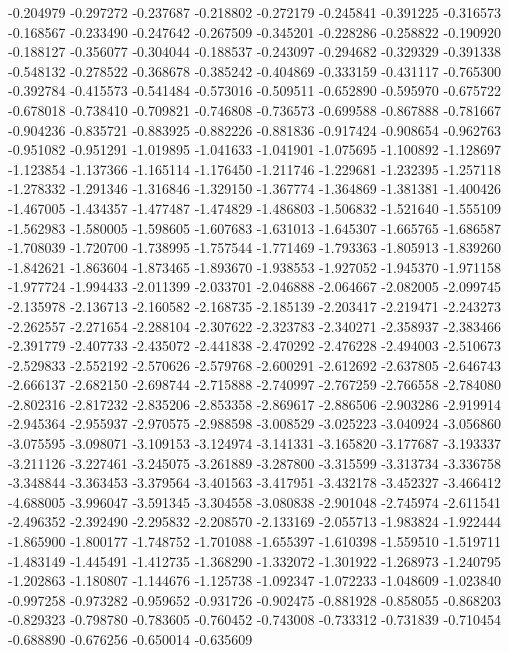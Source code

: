 -0.204979
-0.297272
-0.237687
-0.218802
-0.272179
-0.245841
-0.391225
-0.316573
-0.168567
-0.233490
-0.247642
-0.267509
-0.345201
-0.228286
-0.258822
-0.190920
-0.188127
-0.356077
-0.304044
-0.188537
-0.243097
-0.294682
-0.329329
-0.391338
-0.548132
-0.278522
-0.368678
-0.385242
-0.404869
-0.333159
-0.431117
-0.765300
-0.392784
-0.415573
-0.541484
-0.573016
-0.509511
-0.652890
-0.595970
-0.675722
-0.678018
-0.738410
-0.709821
-0.746808
-0.736573
-0.699588
-0.867888
-0.781667
-0.904236
-0.835721
-0.883925
-0.882226
-0.881836
-0.917424
-0.908654
-0.962763
-0.951082
-0.951291
-1.019895
-1.041633
-1.041901
-1.075695
-1.100892
-1.128697
-1.123854
-1.137366
-1.165114
-1.176450
-1.211746
-1.229681
-1.232395
-1.257118
-1.278332
-1.291346
-1.316846
-1.329150
-1.367774
-1.364869
-1.381381
-1.400426
-1.467005
-1.434357
-1.477487
-1.474829
-1.486803
-1.506832
-1.521640
-1.555109
-1.562983
-1.580005
-1.598605
-1.607683
-1.631013
-1.645307
-1.665765
-1.686587
-1.708039
-1.720700
-1.738995
-1.757544
-1.771469
-1.793363
-1.805913
-1.839260
-1.842621
-1.863604
-1.873465
-1.893670
-1.938553
-1.927052
-1.945370
-1.971158
-1.977724
-1.994433
-2.011399
-2.033701
-2.046888
-2.064667
-2.082005
-2.099745
-2.135978
-2.136713
-2.160582
-2.168735
-2.185139
-2.203417
-2.219471
-2.243273
-2.262557
-2.271654
-2.288104
-2.307622
-2.323783
-2.340271
-2.358937
-2.383466
-2.391779
-2.407733
-2.435072
-2.441838
-2.470292
-2.476228
-2.494003
-2.510673
-2.529833
-2.552192
-2.570626
-2.579768
-2.600291
-2.612692
-2.637805
-2.646743
-2.666137
-2.682150
-2.698744
-2.715888
-2.740997
-2.767259
-2.766558
-2.784080
-2.802316
-2.817232
-2.835206
-2.853358
-2.869617
-2.886506
-2.903286
-2.919914
-2.945364
-2.955937
-2.970575
-2.988598
-3.008529
-3.025223
-3.040924
-3.056860
-3.075595
-3.098071
-3.109153
-3.124974
-3.141331
-3.165820
-3.177687
-3.193337
-3.211126
-3.227461
-3.245075
-3.261889
-3.287800
-3.315599
-3.313734
-3.336758
-3.348844
-3.363453
-3.379564
-3.401563
-3.417951
-3.432178
-3.452327
-3.466412
-4.688005
-3.996047
-3.591345
-3.304558
-3.080838
-2.901048
-2.745974
-2.611541
-2.496352
-2.392490
-2.295832
-2.208570
-2.133169
-2.055713
-1.983824
-1.922444
-1.865900
-1.800177
-1.748752
-1.701088
-1.655397
-1.610398
-1.559510
-1.519711
-1.483149
-1.445491
-1.412735
-1.368290
-1.332072
-1.301922
-1.268973
-1.240795
-1.202863
-1.180807
-1.144676
-1.125738
-1.092347
-1.072233
-1.048609
-1.023840
-0.997258
-0.973282
-0.959652
-0.931726
-0.902475
-0.881928
-0.858055
-0.868203
-0.829323
-0.798780
-0.783605
-0.760452
-0.743008
-0.733312
-0.731839
-0.710454
-0.688890
-0.676256
-0.650014
-0.635609

